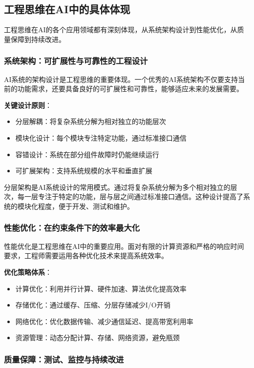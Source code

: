 \subsection{工程思维在AI中的具体体现}

工程思维在AI的各个应用领域都有深刻体现，从系统架构设计到性能优化，从质量保障到持续改进。

\subsubsection{系统架构：可扩展性与可靠性的工程设计}

AI系统的架构设计是工程思维的重要体现。一个优秀的AI系统架构不仅要支持当前的功能需求，还要具备良好的可扩展性和可靠性，能够适应未来的发展需要。

\textbf{关键设计原则}：
\begin{itemize}
\item 分层解耦：将复杂系统分解为相对独立的功能层次
\item 模块化设计：每个模块专注特定功能，通过标准接口通信
\item 容错设计：系统在部分组件故障时仍能继续运行
\item 可扩展架构：支持系统规模的水平和垂直扩展
\end{itemize}

分层架构是AI系统设计的常用模式。通过将复杂系统分解为多个相对独立的层次，每一层专注于特定的功能，层与层之间通过标准接口通信。这种设计提高了系统的模块化程度，便于开发、测试和维护。

\subsubsection{性能优化：在约束条件下的效率最大化}

性能优化是工程思维在AI中的重要应用。面对有限的计算资源和严格的响应时间要求，工程师需要运用各种优化技术来提高系统效率。

\textbf{优化策略体系}：
\begin{itemize}
\item 计算优化：利用并行计算、硬件加速、算法优化提高效率
\item 存储优化：通过缓存、压缩、分层存储减少I/O开销
\item 网络优化：优化数据传输、减少通信延迟、提高带宽利用率
\item 资源管理：动态分配计算、存储、网络资源，避免瓶颈
\end{itemize}

\subsubsection{质量保障：测试、监控与持续改进}

